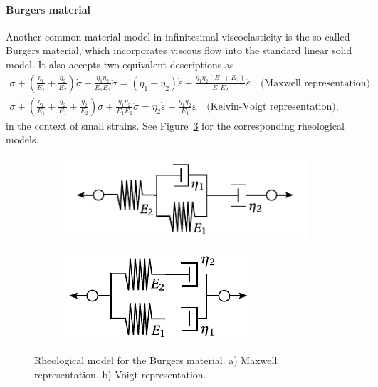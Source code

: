 \paragraph{Burgers material}
Another common material model in infinitesimal viscoelasticity is the so-called Burgers material, which incorporates viscous flow into the standard linear solid model.
It also accepts two equivalent descriptions as
\begin{gather}
	\sigma+\left(\frac{\eta_1}{E_1}+\frac{\eta_2}{E_2}\right) \dot{\sigma}+\frac{\eta_1 \eta_2}{E_1 E_2} \ddot{\sigma}=\left(\eta_1+\eta_2\right) \dot{\varepsilon}+\frac{\eta_1 \eta_2\left(E_1+E_2\right)}{E_1 E_2} \ddot{\varepsilon}\quad \text{(Maxwell representation)},\\
	\sigma+\left(\frac{\eta_1}{E_1}+\frac{\eta_2}{E_1}+\frac{\eta_2}{E_2}\right) \dot{\sigma}+\frac{\eta_1 \eta_2}{E_1 E_2} \ddot{\sigma}=\eta_2 \dot{\varepsilon}+\frac{\eta_1 \eta_2}{E_1} \ddot{\varepsilon}\quad \text{(Kelvin-Voigt representation)},
\end{gather}
in the context of small strains.
See Figure~\ref{fig:rheo_model_burgers} for the corresponding rheological models.
\begin{figure}
\centering
\begin{subfigure}[b]{0.57\textwidth}
\centering
\includegraphics[width=\textwidth]{figures/rheo_model_burgers_maxwell}
\caption{}
\label{subfig:rheo_model_burgers_maxwell}
\end{subfigure} \hfill
	\begin{subfigure}[b]{0.42\textwidth}
		\centering
						\includegraphics[width=\textwidth]{figures/rheo_model_burgers_voigt}
						\caption{}
						\label{subfig:rheo_model_burgers_voigt}
		\end{subfigure}
  \caption{Rheological model for the Burgers material. a) Maxwell representation. b) Voigt representation.}
  \label{fig:rheo_model_burgers}
\end{figure}


